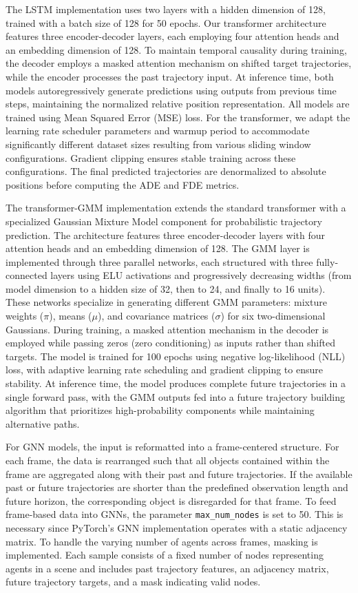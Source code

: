 The LSTM implementation uses two layers with a hidden dimension of 128, trained with a batch size of 128 for 50 epochs. Our transformer architecture features three encoder-decoder layers, each employing four attention heads and an embedding dimension of 128. To maintain temporal causality during training, the decoder employs a masked attention mechanism on shifted target trajectories, while the encoder processes the past trajectory input. At inference time, both models autoregressively generate predictions using outputs from previous time steps, maintaining the normalized relative position representation. All models are trained using Mean Squared Error (MSE) loss. For the transformer, we adapt the learning rate scheduler parameters and warmup period to accommodate significantly different dataset sizes resulting from various sliding window configurations. Gradient clipping ensures stable training across these configurations. The final predicted trajectories are denormalized to absolute positions before computing the ADE and FDE metrics.

The transformer-GMM implementation extends the standard transformer with a specialized Gaussian Mixture Model component for probabilistic trajectory prediction. The architecture features three encoder-decoder layers with four attention heads and an embedding dimension of 128. The GMM layer is implemented through three parallel networks, each structured with three fully-connected layers using ELU activations and progressively decreasing widths (from model dimension to a hidden size of 32, then to 24, and finally to 16 units). These networks specialize in generating different GMM parameters: mixture weights ($\pi$), means ($\mu$), and covariance matrices ($\sigma$) for six two-dimensional Gaussians. During training, a masked attention mechanism in the decoder is employed while passing zeros (zero conditioning) as inputs rather than shifted targets. The model is trained for 100 epochs using negative log-likelihood (NLL) loss, with adaptive learning rate scheduling and gradient clipping to ensure stability. At inference time, the model produces complete future trajectories in a single forward pass, with the GMM outputs fed into a future trajectory building algorithm that prioritizes high-probability components while maintaining alternative paths.


For GNN models, the input is reformatted into a frame-centered structure. For each frame, the data is rearranged such that all objects contained within the frame are aggregated along with their past and future trajectories. If the available past or future trajectories are shorter than the predefined observation length and future horizon, the corresponding object is disregarded for that frame. To feed frame-based data into GNNs, the parameter \texttt{max\_num\_nodes} is set to 50. This is necessary since PyTorch's GNN implementation operates with a static adjacency matrix. To handle the varying number of agents across frames, masking is implemented. Each sample consists of a fixed number of nodes representing agents in a scene and includes past trajectory features, an adjacency matrix, future trajectory targets, and a mask indicating valid nodes.

